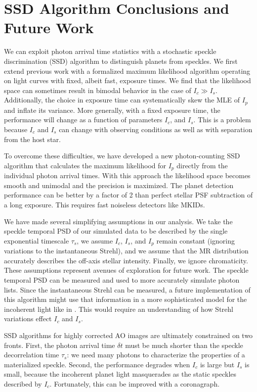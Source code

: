 \documentclass[../main.tex]{subfiles}
\begin{document}
\section{SSD Algorithm Conclusions and Future Work} \label{sec:conclusions}

We can exploit photon arrival time statistics with a stochastic speckle discrimination (SSD) algorithm to distinguish planets from speckles. We first extend previous work with a formalized maximum likelihood algorithm operating on light curves with fixed, albeit fast, exposure times. We find that the likelihood space can sometimes result in bimodal behavior in the case of $I_c \gg I_s$. Additionally, the choice in exposure time can systematically skew the MLE of $I_p$ and inflate its variance. More generally, with a fixed exposure time, the performance will change as a function of parameters $I_c$, and $I_s$. This is a problem because $I_c$ and $I_s$ can change with observing conditions as well as with separation from the host star.

To overcome these difficulties, we have developed a new photon-counting SSD algorithm that calculates the maximum likelihood for $I_p$ directly from the individual photon arrival times. With this approach the likelihood space becomes smooth and unimodal and the precision is maximized. The planet detection performance can be better by a factor of 2 than perfect stellar PSF subtraction of a long exposure. This requires fast noiseless detectors like MKIDs. 

We have made several simplifying assumptions in our analysis. We take the speckle temporal PSD of our simulated data to be described by the single exponential timescale $\tau_s$, we assume $I_c$, $I_s$, and $I_p$ remain constant (ignoring variations to the instantaneous Strehl), and we assume that the MR distribution accurately describes the off-axis stellar intensity. Finally, we ignore chromaticity. These assumptions represent avenues of exploration for future work. The speckle temporal PSD can be measured and used to more accurately simulate photon lists. Since the instantaneous Strehl can be measured, a future implementation of this algorithm might use that information in a more sophisticated model for the incoherent light like in \textcite{Gladysz_2008b}. This would require an understanding of how Strehl variations effect $I_c$ and $I_s$. 

SSD algorithms for highly corrected AO images are ultimately constrained on two fronts. First, the photon arrival time $\delta t$ must be much shorter than the speckle decorrelation time $\tau_s$: we need many photons to characterize the properties of a materialized speckle. Second, the performance degrades when $I_c$ is large but $I_s$ is small, because the incoherent planet light masquerades as the static speckles described by $I_c$. Fortunately, this can be improved with a coronagraph. 
\end{document}
